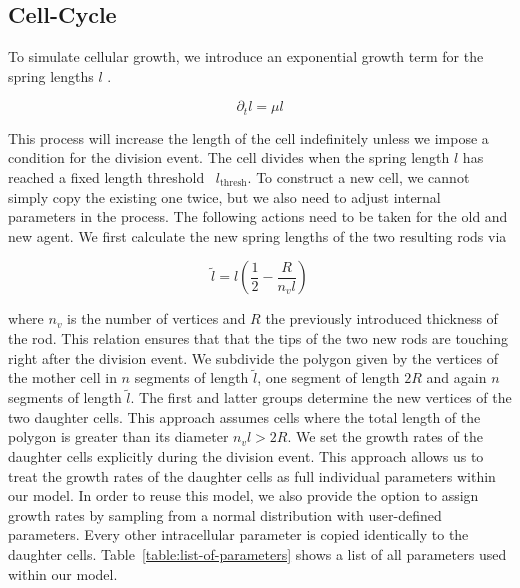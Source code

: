\documentclass{article}
\begin{document}
\subsection{Cell-Cycle}

To simulate cellular growth, we introduce an exponential growth term for the spring lengths $l$
\cite{Takeuchi2005}.

\begin{equation}
    \partial_t l = \mu l
\end{equation}

This process will increase the length of the cell indefinitely unless we impose a condition for the
division event.
The cell divides when the spring length $l$ has reached a fixed length threshold~\cite{Robert2014}
$l_\text{thresh}$.
To construct a new cell, we cannot simply copy the existing one twice, but we also need to adjust
internal parameters in the process.
The following actions need to be taken for the old and new agent.
We first calculate the new spring lengths of the two resulting rods via

\begin{equation}
    \tilde{l} = l\left(\frac{1}{2} - \frac{R}{n_v l}\right)
\end{equation}

where $n_v$ is the number of vertices and $R$ the previously introduced thickness of the rod.
This relation ensures that that the tips of the two new rods are touching right after the division
event.
We subdivide the polygon given by the vertices of the mother cell in $n$ segments of length
$\tilde{l}$, one segment of length $2R$ and again $n$ segments of length $\tilde{l}$.
The first and latter groups determine the new vertices of the two daughter cells.
This approach assumes cells where the total length of the polygon is greater than its diameter
$n_vl>2R$.
We set the growth rates of the daughter cells explicitly during the division event.
This approach allows us to treat the growth rates of the daughter cells as full individual
parameters within our model.
In order to reuse this model, we also provide the option to assign growth rates by sampling from a
normal distribution with user-defined parameters.
Every other intracellular parameter is copied identically to the daughter cells.
Table~\ref{table:list-of-parameters} shows a list of all parameters used within our model.
\end{document}
